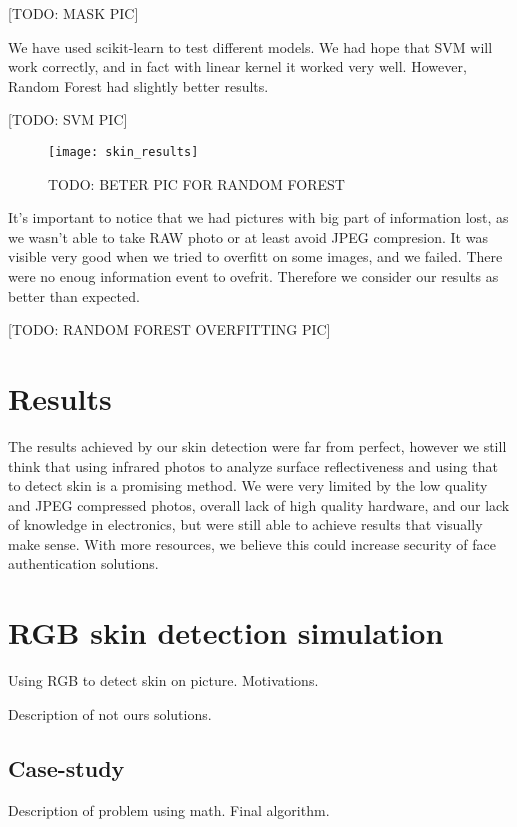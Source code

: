                 [TODO: MASK PIC]

                We have used scikit-learn to test different models.
                We had hope that SVM will work correctly,
                and in fact with linear kernel it worked very well.
                However, Random Forest had slightly better results.

                [TODO: SVM PIC]

                \begin{figure}[H]
                    \caption{TODO: BETER PIC FOR RANDOM FOREST}
                    \centering
                    \texttt{[image: skin\_results]}
                    \label{fig:skin_results}
                \end{figure}

                It's important to notice that we had pictures
                with big part of information lost,
                as we wasn't able to take RAW photo or at least
                avoid JPEG compresion. It was visible very good
                when we tried to overfitt on some images, and
                we failed. There were no enoug information event to ovefrit.
                Therefore we consider our results as better than expected.

                [TODO: RANDOM FOREST OVERFITTING PIC]

    \section{Results}
        The results achieved by our skin detection were far from perfect,
        however we still think that using infrared photos to analyze surface
        reflectiveness and using that to detect skin is a promising method.
        We were very limited by the low quality and JPEG compressed photos,
        overall lack of high quality hardware, and our lack of knowledge in electronics,
        but were still able to achieve results that visually make sense.
        With more resources, we believe this could increase security of
        face authentication solutions.

    \section{RGB skin detection simulation}
        Using RGB to detect skin on picture.
        Motivations.

        Description of not ours solutions.

        \subsection*{Case-study}
            Description of problem using math.
            Final algorithm.
